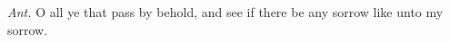 \begin{Parallel}[v]{\colw}{\colx}
{}
{\vern
{\noindent
\textit{Ant.} O all ye that pass by behold, and see if there be any sorrow like unto my sorrow.}}

\end{Parallel}